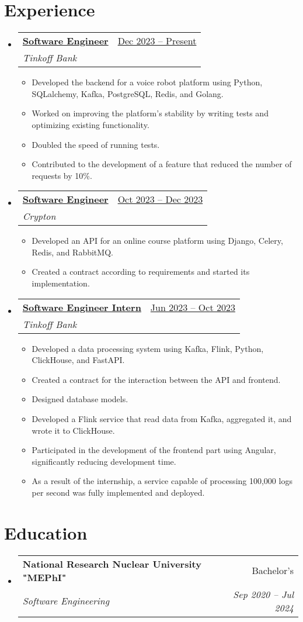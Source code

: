 \documentclass[a4paper,11pt]{article}
\makeatletter
\newcommand{\resumeItem}[1]{
  \item\small{#1}
}
\newcommand{\resumeItemListStart}{\begin{itemize}[rightmargin=0.11in]}
\newcommand{\resumeItemListEnd}{\end{itemize}}
\newcommand{\resumeQuadHeading}[4]{
  \item
  \begin{tabular*}{0.96\textwidth}[t]{l@{\extracolsep{\fill}}r}
    \textbf{#1} & #2 \\
    \textit{\small#3} & \textit{\small #4} \\
  \end{tabular*}
}
\newcommand{\resumeHeadingListStart}{
  \begin{itemize}[leftmargin=0.15in, label={}]
}
\newcommand{\resumeHeadingListEnd}{\end{itemize}}
\makeatother
\begin{document}
\section{Experience}
\resumeHeadingListStart{}
  \resumeQuadHeading{\underline{Software Engineer}}{\underline{Dec 2023 -- Present}}
  {Tinkoff Bank}{}
    \resumeItemListStart{}
      \resumeItem{Developed the backend for a voice robot platform using Python, SQLalchemy, Kafka, PostgreSQL, Redis, and Golang.}
      \resumeItem{Worked on improving the platform's stability by writing tests and optimizing existing functionality.}
      \resumeItem{Doubled the speed of running tests.}
      \resumeItem{Contributed to the development of a feature that reduced the number of requests by 10\%.}
    \resumeItemListEnd{}
  \resumeQuadHeading{\underline{Software Engineer}}{\underline{Oct 2023 -- Dec 2023}}
  {Crypton}{}
    \resumeItemListStart{}
      \resumeItem{Developed an API for an online course platform using Django, Celery, Redis, and RabbitMQ.}
      \resumeItem{Created a contract according to requirements and started its implementation.}
    \resumeItemListEnd{}
  \resumeQuadHeading{\underline{Software Engineer Intern}}{\underline{Jun 2023 -- Oct 2023}}
  {Tinkoff Bank}{}
    \resumeItemListStart{}
      \resumeItem{Developed a data processing system using Kafka, Flink, Python, ClickHouse, and FastAPI.}
      \resumeItem{Created a contract for the interaction between the API and frontend.}
      \resumeItem{Designed database models.}
      \resumeItem{Developed a Flink service that read data from Kafka, aggregated it, and wrote it to ClickHouse.}
      \resumeItem{Participated in the development of the frontend part using Angular, significantly reducing development time.}
      \resumeItem{As a result of the internship, a service capable of processing 100,000 logs per second was fully implemented and deployed.}
    \resumeItemListEnd{}
\resumeHeadingListEnd{}



\section{Education}
  \resumeHeadingListStart{}
    \resumeQuadHeading{National Research Nuclear University "MEPhI"}{Bachelor's}
    {Software Engineering}{Sep 2020 -- Jul 2024}
  \resumeHeadingListEnd{}
\end{document}
